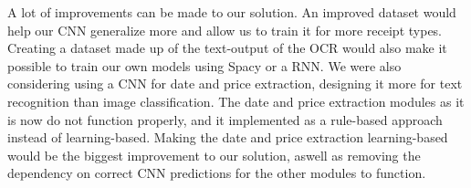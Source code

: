 A lot of improvements can be made to our solution.
An improved dataset would help our CNN generalize more and allow us to train it for more receipt types.
Creating a dataset made up of the text-output of the OCR would also make it possible to train our own models using Spacy or a RNN.
We were also considering using a CNN for date and price extraction, designing it more for text recognition than image classification.
The date and price extraction modules as it is now do not function properly, and it implemented as a rule-based approach instead of learning-based.
Making the date and price extraction learning-based would be the biggest improvement to our solution, aswell as removing the dependency on correct CNN predictions for the other modules to function.




